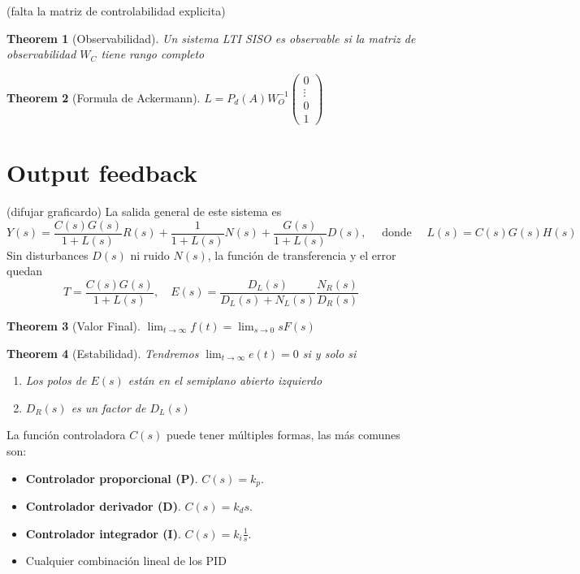 \documentclass[leqno]{article}
\newtheorem*{theorem}{Theorem}
\begin{document}
(falta la matriz de controlabilidad explicita)

\begin{theorem}[Observabilidad] Un sistema LTI SISO es observable si la matriz de observabilidad $W_C$ tiene rango completo
\end{theorem}

\begin{theorem}[Formula de Ackermann]
  $L = P_d(A)W_O^{-1}\begin{pmatrix}  0 \\ \vdots \\ 0 \\ 1 \end{pmatrix}$ 
\end{theorem}



\section{Output feedback}
(difujar graficardo)
La salida general de este sistema es 
\[
Y(s) = \frac{C(s)G(s)}{1+L(s)}R(s) + \frac{1}{1+L(s)}N(s) + \frac{G(s)}{1+L(s)}D(s), \quad \text{ donde } \quad L(s) = C(s)G(s)H(s)
\] 
Sin disturbances $D(s)$ ni ruido $N(s)$, la función de transferencia y el error quedan
\[
T = \frac{C(s)G(s)}{1+L(s)}, \quad E(s) = \frac{D_L(s)}{D_L(s)+N_L(s)} \frac{N_R(s)}{D_R(s)}
\] 

\begin{theorem}[Valor Final] $\lim_{t \to \infty} f(t) = \lim_{s \to 0}sF(s)$
\end{theorem}

\begin{theorem}[Estabilidad] Tendremos $\lim_{t \to  \infty} e(t) =0$ si y solo si
  \begin{enumerate}[topsep=-6pt, itemsep=0pt]
    \item Los polos de $E(s)$ están en el semiplano abierto izquierdo 
	\item $D_R(s)$ es un factor de  $D_L(s)$
  \end{enumerate}
\end{theorem}

La función controladora $C(s)$ puede tener múltiples formas, las más comunes son:
 \begin{itemize}[topsep=-6pt, itemsep=0pt]
  \item \textbf{Controlador proporcional (P)}. $C(s)=k_p$.
  \item \textbf{Controlador derivador (D)}. $C(s)=k_ds$.
  \item \textbf{Controlador integrador (I)}. $C(s)=k_i \frac{1}{s}$.
  \item Cualquier combinación lineal de los PID
\end{itemize}
\end{document}

